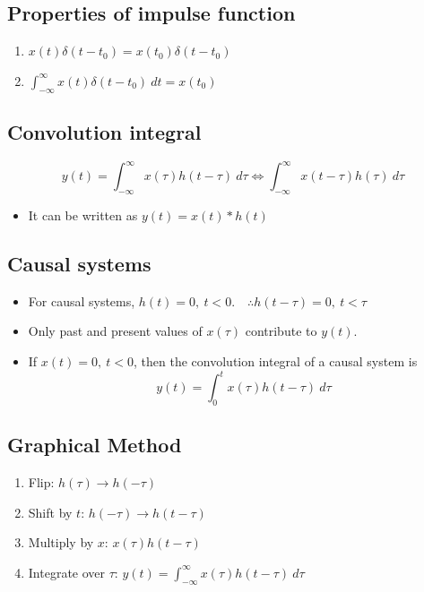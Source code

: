 \documentclass[a4paper]{article}
\begin{document}
\subsection{Properties of impulse function}
\begin{enumerate}
    \item $x(t)\delta(t-t_0) = x(t_0)\delta(t-t_0)$
    \item $\displaystyle\int_{-\infty}^{\infty} x(t)\delta(t-t_0)\ dt = x(t_0)$
\end{enumerate}

\subsection{Convolution integral}
$$y(t) = \int_{-\infty}^{\infty}x(\tau)h(t-\tau)\ d\tau\Longleftrightarrow\int_{-\infty}^{\infty}x(t-\tau)h(\tau)\ d\tau$$
\begin{itemize}
    \item It can be written as $y(t) = x(t)*h(t)$
\end{itemize}

\subsection{Causal systems}
\begin{itemize}
    \item For causal systems, $h(t) = 0,\ t < 0.\quad \therefore h(t-\tau) = 0,\ t < \tau$
    \item Only past and present values of $x(\tau)$ contribute to $y(t)$.
    \item If $x(t) = 0,\ t < 0$, then the convolution integral of a causal system is
    $$y(t) = \int_0^t x(\tau)h(t-\tau)\ d\tau$$
\end{itemize}

\subsection{Graphical Method}
\begin{enumerate}
    \item Flip: $h(\tau)\rightarrow h(-\tau)$
    \item Shift by $t$: $h(-\tau)\rightarrow h(t-\tau)$
    \item Multiply by $x$: $x(\tau)h(t-\tau)$
    \item Integrate over $\tau$: $\displaystyle y(t) = \int_{-\infty}^{\infty}x(\tau)h(t-\tau)\ d\tau$
\end{enumerate}
\end{document}
